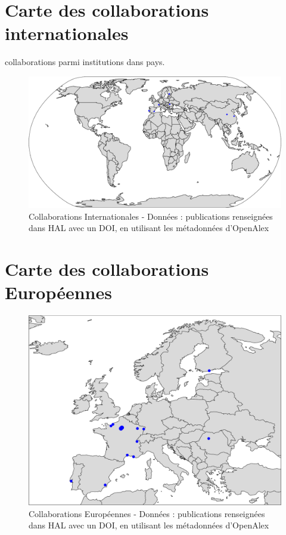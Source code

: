 \documentclass[french, 11pt]{dibiso/biso}
\begin{document}
{
  \footnotesize
  
}

\pagebreak

\section{Carte des collaborations internationales}

{\collaborationsnb} collaborations parmi {\institutionsnb} institutions dans {\countriesnb} pays.

\begin{figure}[!h]
  \hspace{-.1\textwidth}\includegraphics[width=1.2\textwidth]{figures/collaboration_map_world.pdf}
  \caption{Collaborations Internationales - Données : publications renseignées dans HAL avec un DOI, en utilisant les métadonnées d'OpenAlex}
  \label{fig_collab_map}
\end{figure}

\pagebreak

\section{Carte des collaborations Européennes}

\begin{figure}[!h]
  \includegraphics[width=\textwidth]{figures/collaboration_map_europe.pdf}
  \caption{Collaborations Européennes - Données : publications renseignées dans HAL avec un DOI, en utilisant les métadonnées d'OpenAlex}
  \label{fig_collab_map_europe}
\end{figure}
\end{document}
